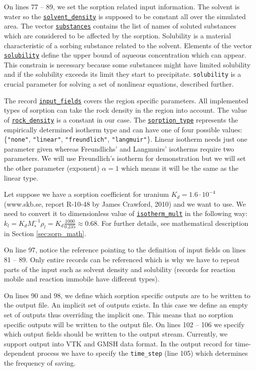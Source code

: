On lines 77 -- 89, we set the sorption related input information. The solvent is water so the \hyperlink{Sorption::solvent-density::B}{\tt solvent\_density} 
is supposed to be constant all over the simulated area. The vector \hyperlink{Sorption::substances::B}{\tt substances} 
contains the list of names of soluted substances which are considered to be affected by the sorption.
Solubility is a material characteristic of a sorbing substance related to the solvent. Elements of the vector 
\hyperlink{Sorption::solubility::B}{\tt solubility} define the upper bound of aqueous concentration which can appear.
This constrain is necessary because some substances might have limited solubility and if the solubility exceeds 
its limit they start to precipitate. {\tt solubility} is a crucial parameter for solving a set of nonlinear 
equations, described further. 

The record \hyperlink{IT::Sorption-Data}{\tt input\_fields} covers the region specific parameters.
All implemented types of sorption can take the rock density in the region into account. The value of 
\hyperlink{Sorption-Data::rock-density::B}{\tt rock\_density} is a constant in our case. 
The \hyperlink{Sorption-Data::sorption-type::B}{\tt sorption\_type} represents the empirically determined isotherm 
type and can have one of four possible values: \{{\tt"none"}, {\tt"linear"}, {\tt"freundlich"}, {\tt"langmuir"}\}. 
Linear isotherm needs just one parameter given whereas Freundlichs' and Langmuirs' isotherms require two parameters. 
We will use Freundlich's isotherm for demonstration but we will set the other parameter (exponent) $\alpha=1$ 
which means it will be the same as the linear type. 

Let suppose we have a sorption coefficient for uranium $K_d=1.6\cdot10^{-4}$  (www.skb.se, report R-10-48 by James Crawford, 2010) 
and we want to use. We need to convert it to dimensionless value of \hyperlink{Sorption-Data::isotherm-mult::B}{\tt isotherm\_mult}
in the following way: $k_l = K_dM_s^{-1}\rho_l = K_d\frac{1000}{0.235}\approx0.68$. For further details, see 
mathematical description in Section \ref{sec:sorp_math}. 

On line 97, notice the reference pointing to the definition of input fields on lines 81 -- 89. Only entire records 
can be referenced which is why we have to repeat parts of the input such as solvent density and solubility 
(records for reaction mobile and reaction immobile have different types).

On lines 90 and 98, we define which sorption specific outputs are to be written to the output file. 
An implicit set of outputs exists. In this case we define an empty set of outputs thus overriding the implicit one. 
This means that no sorption specific outputs will be written to the output file.
On lines 102 -- 106 we specify which output fields should be written to the output stream. Currently, we support output into VTK and GMSH data format.
In the output record for time-dependent process we have to specify the {\tt time\_step} (line 105) which determines the frequency of saving.



